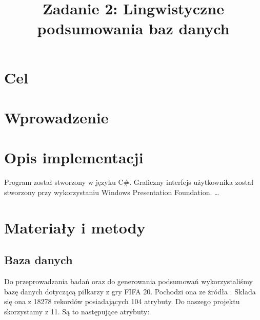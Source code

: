 \documentclass{classrep}
\author{
	\studentinfo{Radosław Grela}{216769} \and
	\studentinfo{Jakub Wąchała}{216914} 
}
\title{Zadanie 2: Lingwistyczne podsumowania baz danych}
\begin{document}
	\maketitle
	
	\section{Cel} %
	
	
	\section{Wprowadzenie} %
	
	\section{Opis implementacji} %
	Program został stworzony w języku C\#. Graficzny interfejs użytkownika został stworzony przy wykorzystaniu Windows Presentation Foundation. \ldots 
	
	\section{Materiały i metody} %
	\subsection{Baza danych}
	Do przeprowadzania badań oraz do generowania podsumowań wykorzystaliśmy bazę danych dotyczącą piłkarzy z gry FIFA 20. Pochodzi ona ze źródła \cite{baza}. Składa się ona z 18278 rekordów posiadających 104 atrybuty. Do naszego projektu skorzystamy z 11. Są to następujące atrybuty:
	
\end{document}
